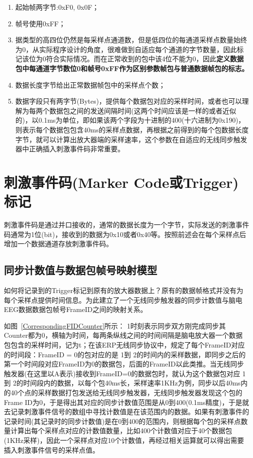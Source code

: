 \begin{enumerate}
\item 起始帧两字节:0xF0, 0x0F；
\item 帧号使用0xFF；
\item 据类型的高四位仍然是每采样点通道数，但是低四位的每通道采样点数量始终为0，从实际程序设计的角度，很难做到自适应每个通道的字节数量，因此标记该位为0符合实际情况。而在正常收到的包中该4位不能为0，因此\textbf{定义数据包中每通道字节数位0和帧号0xFF作为区别参数帧包与普通数据帧包的标志。}
\item 数据长度字节给出正常数据帧包中的采样点个数；
\item 数据字段只有两字节(Bytes)，提供每个数据包对应的采样时间，或者也可以理解为每两个数据包之间的发送间隔时间(这两个时间应该是一样的或者近似的)，以0.1ms为单位，即如果该两个字段为十进制的400(十六进制为0x190)，则表示每个数据包包含40ms的采样点数据，再根据之前得到的每个包数据长度字节，就可以计算出放大器端的采样速率，这个参数在自适应的无线同步触发器中正确插入刺激事件码非常重要。
\end{enumerate}

\section{刺激事件码(Marker Code或Trigger)标记}
	刺激事件码是通过并口接收的，通常的数据长度为一个字节，实际发送的刺激事件码通常为1位(bit)，接收到的数据为0x10或者0x40等。按照前述会在每个采样点后增加一个数据通道存放刺激事件码。

\subsection{同步计数值与数据包帧号映射模型}
	如何将记录到的Trigger标记到原有的放大器数据上？原有的数据帧格式并没有为每个采样点提供时间信息。为此建立了一个无线同步触发器的同步计数值与脑电EEG数据数据包帧号FrameID之间的映射关系。

如图~\ref{CorrespondingFIDCounter}所示： {\textcircled{\small{1}}}时刻表示同步双方刚完成同步其Counter都为0，横轴为时间，每两条纵线之间的时间间隔是脑电放大器一个数据包包含的采样时间，记为t；在该ERP无线同步协议中，规定了每个FrameID对应的时间段：FrameID = 0的包对应的是 {\textcircled{\small{1}}}到 {\textcircled{\small{2}}}的时间内的采样数据，即同步之后的第一个时间段对应FrameID为0的数据包，后面的FrameID以此类推。当无线同步触发器(在这里以A表示)接收到FrameID=0的数据包时，就认为这个数据包对应 {\textcircled{\small{1}}}到 {\textcircled{\small{2}}}的时间段内的数据，以每个包40ms长，采样速率1KHz为例，同步以后40ms内的40个点的采样数据打包发送给无线同步触发器，无线同步触发器发现这个包的Frame ID为0，于是得出其对应的同步计数值范围是从0到400(0.1ms精度)，于是就去记录刺激事件信号的数组中寻找计数值是在该范围内的数据。如果有刺激事件的记录时间(其记录时的同步计数值)是在0到400的范围内，则根据每个包的采样点数量计算出每个采样点对应的计数值数量，比如400个计数值对应于40个数据包(1KHz采样)，因此一个采样点对应10个计数值，再经过相关运算就可以得出需要插入刺激事件信号的采样点值。

